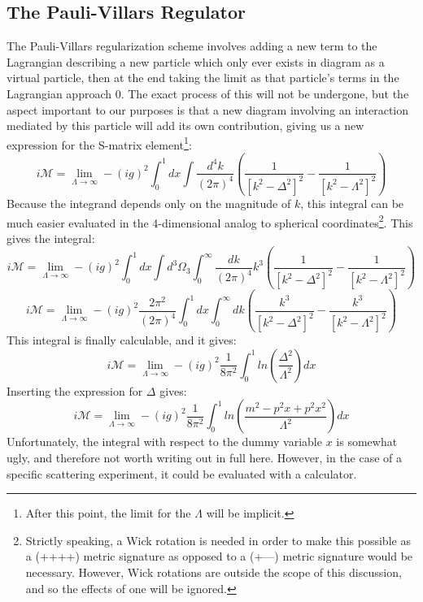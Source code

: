 \documentclass{report}
\begin{document}
\subsection{The Pauli-Villars Regulator}
The Pauli-Villars regularization scheme involves adding a new term to the Lagrangian describing a new particle which only ever exists in diagram as a virtual particle, then at the end taking the limit as that particle's terms in the Lagrangian approach 0. The exact process of this will not be undergone, but the aspect important to our purposes is that a new diagram involving an interaction mediated by this particle will add its own contribution, giving us a new expression for the S-matrix element\footnote{After this point, the limit for the $\Lambda$ will be implicit.}:
\[
i \mathcal{M} = \lim_{\Lambda \rightarrow \infty} -(ig)^2 \int_0^1 dx \int \frac{d^4k}{(2\pi)^4} (\frac{1}{[k^2 - \Delta^2]^2} - \frac{1}{[k^2 - \Lambda^2]^2})
\]
Because the integrand depends only on the magnitude of $k$, this integral can be much easier evaluated in the 4-dimensional analog to spherical coordinates\footnote{Strictly speaking, a Wick rotation is needed in order to make this possible as a (++++) metric signature as opposed to a (+---) metric signature would be necessary. However, Wick rotations are outside the scope of this discussion, and so the effects of one will be ignored.}. This gives the integral:
\[
i \mathcal{M} = \lim_{\Lambda \rightarrow \infty} -(ig)^2 \int_0^1 dx \int d^3\Omega_3 \int_0^{\infty} \frac{dk}{(2\pi)^4} k^3 (\frac{1}{[k^2 - \Delta^2]^2} - \frac{1}{[k^2 - \Lambda^2]^2})
\]
\[
i \mathcal{M} = \lim_{\Lambda \rightarrow \infty} -(ig)^2 \frac{2\pi^2}{(2\pi)^4}  \int_0^1 dx \int_0^{\infty} dk (\frac{k^3}{[k^2 - \Delta^2]^2} - \frac{k^3}{[k^2 - \Lambda^2]^2})
\]
This integral is finally calculable, and it gives:
\[
i \mathcal{M} = \lim_{\Lambda \rightarrow \infty} -(ig)^2 \frac{1}{8\pi^2}  \int_0^1 ln(\frac{\Delta^2}{\Lambda^2}) dx
\]
Inserting the expression for $\Delta$ gives:
\[
i \mathcal{M} = \lim_{\Lambda \rightarrow \infty} -(ig)^2 \frac{1}{8\pi^2}  \int_0^1 ln(\frac{m^2 - p^2x + p^2x^2}{\Lambda^2}) dx
\]
Unfortunately, the integral with respect to the dummy variable $x$ is somewhat ugly, and therefore not worth writing out in full here. However, in the case of a specific scattering experiment, it could be evaluated with a calculator.
\end{document}

